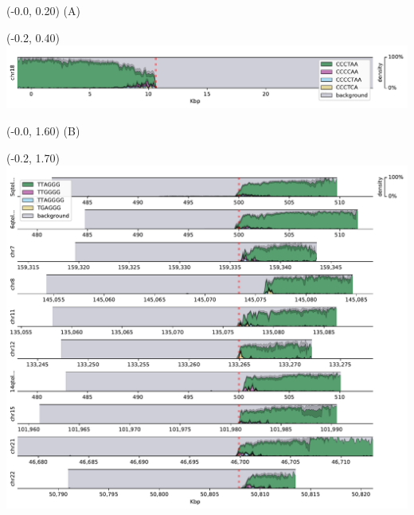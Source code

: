 \documentclass{article}
\begin{document}
\begin{textblock}{13}(-0.0,  0.20) \LARGE{(A)} \end{textblock}
\begin{textblock}{13}(-0.2,  0.40) \includegraphics[width=.6\textwidth,keepaspectratio]{latex/figures/densityplots/HG003-densityplot-p_arm.pdf}   \end{textblock}

\begin{textblock}{13}(-0.0,  1.60) \LARGE{(B)} \end{textblock}
\begin{textblock}{13}(-0.2,  1.70) \includegraphics{latex/figures/densityplots/HG003-densityplot-q_arm.pdf}   \end{textblock}
\end{document}
